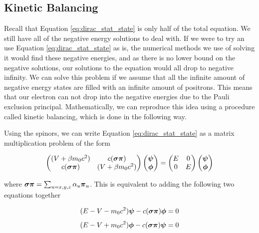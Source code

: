 \documentclass[12pt]{report}
\begin{document}
\subsection{Kinetic Balancing}
Recall that Equation \ref{eq:dirac_stat_state} is only half of the total equation. We still have all of the negative energy solutions to deal with. If we were to try an use Equation \ref{eq:dirac_stat_state} as is, the numerical methods we use of solving it would find these negative energies, and as there is no lower bound on the negative solutions, our solutions to the equation would all drop to negative infinity. We can solve this problem if we assume that all the infinite amount of negative energy states are filled with an infinite amount of positrons. This means that our electron can not drop into the negative energies due to the Pauli exclusion principal. Mathematically, we can reproduce this idea using a procedure called kinetic balancing, which is done in the following way.
 
Using the spinors, we can write Equation \ref{eq:dirac_stat_state} as a matrix multiplication problem of the form

\begin{equation}
\label{eq:dirac_stat_state_matmul}
\begin{pmatrix}
(V + \beta m_{0}c^{2})	&	c({\bf{\sigma\pi}})		\\
c({\bf{\sigma\pi}})		&	(V + \beta m_{0}c^{2})	\\
\end{pmatrix}
\begin{pmatrix}
{\bf{\psi}}	\\
{\bf{\phi}}	\\
\end{pmatrix}
=
\begin{pmatrix}
E	&	0	\\
0	&	E	\\
\end{pmatrix}
\begin{pmatrix}
{\bf{\psi}}	\\
{\bf{\phi}}	\\
\end{pmatrix}
\end{equation}

where ${\bf{\sigma\pi}} =\sum_{u=x,y,z}\alpha_{u}{\bf{\pi}}_{u}$. This is equivalent to adding the following two equations together

\begin{equation}
\label{eq:dirac_matmul_p1}
(E - V - m_{0}c^{2}){\bf{\psi}} - c({\bf{\sigma\pi}}){\bf{\phi}} = 0
\end{equation}
\begin{equation}
\label{eq:dirac_matmul_p2}
(E - V + m_{0}c^{2}){\bf{\phi}} - c({\bf{\sigma\pi}}){\bf{\psi}} = 0
\end{equation}
\end{document}

